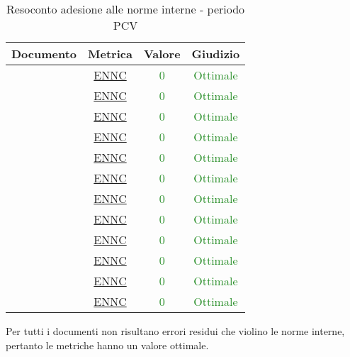 						\begin{table}[H]
							\centering
							\small
						\begin{tabular}{c | c | c | c}
							\hline
							\textbf{Documento} & \textbf{Metrica}    & \textbf{Valore} & \textbf{Giudizio} \\ \hline
							\pdpvtre        & \hyperref[MLEC]{ENNC}  & \textcolor{ForestGreen}{0} & \textcolor{ForestGreen}{Ottimale} \\
							\pdqvtre        & \hyperref[MLEC]{ENNC} &  \textcolor{ForestGreen}{0} & \textcolor{ForestGreen}{Ottimale} \\
							\ndpvtre        & \hyperref[MLEC]{ENNC}  & \textcolor{ForestGreen}{0} & \textcolor{ForestGreen}{Ottimale} \\
							\adrvtre        & \hyperref[MLEC]{ENNC}   & \textcolor{ForestGreen}{0} & \textcolor{ForestGreen}{Ottimale} \\
							\stvdue		& \hyperref[MLEC]{ENNC}  & \textcolor{ForestGreen}{0} & \textcolor{ForestGreen}{Ottimale} \\
							\glvdue        & \hyperref[MLEC]{ENNC}  & \textcolor{ForestGreen}{0} & \textcolor{ForestGreen}{Ottimale} \\
							\ddpvuno        & \hyperref[MLEC]{ENNC}  & \textcolor{ForestGreen}{0} & \textcolor{ForestGreen}{Ottimale} \\
							\manutvuno        & \hyperref[MLEC]{ENNC}  & \textcolor{ForestGreen}{0} & \textcolor{ForestGreen}{Ottimale} \\
							\manmanvuno        & \hyperref[MLEC]{ENNC}  & \textcolor{ForestGreen}{0} & \textcolor{ForestGreen}{Ottimale} \\
							\vsesettei       & \hyperref[MLEC]{ENNC} & \textcolor{ForestGreen}{0} & \textcolor{ForestGreen}{Ottimale} \\
							\vottoi       & \hyperref[MLEC]{ENNC}  & \textcolor{ForestGreen}{0} & \textcolor{ForestGreen}{Ottimale} \\
							\vquattroe       & \hyperref[MLEC]{ENNC} & \textcolor{ForestGreen}{0} & \textcolor{ForestGreen}{Ottimale} \\
						\end{tabular}
							\caption{Resoconto adesione alle norme interne - periodo PCV}
							\label{tab_resoconto_adesione_alle_norme_interne_PCV}
						\end{table}
						
						Per tutti i documenti non risultano errori residui che violino le norme interne, pertanto le metriche hanno un valore ottimale.
						
